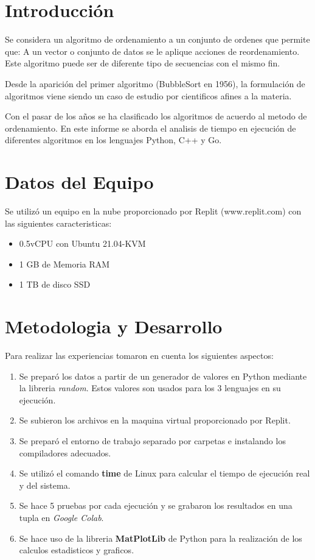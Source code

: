 \documentclass{article}
\begin{document}
	
		

    \section{Introducción}
    Se considera un algoritmo de ordenamiento a un conjunto de ordenes que permite que: A un vector o conjunto de datos se le aplique acciones de reordenamiento. Este algoritmo puede ser de diferente tipo de secuencias con el mismo fin. 

    Desde la aparición del primer algoritmo (BubbleSort en 1956), la formulación de algoritmos viene siendo un caso de estudio por cientificos afines a la materia.

    Con el pasar de los años se ha clasificado los algoritmos de acuerdo al metodo de ordenamiento.
    En este informe se aborda el analisis de tiempo en ejecución de diferentes algoritmos en los lenguajes Python, C++ y Go.
    
    \section{Datos del Equipo}
    Se utilizó un equipo en la nube proporcionado por Replit (www.replit.com) con las siguientes caracteristicas:

    \begin{itemize}
        \item 0.5vCPU con Ubuntu 21.04-KVM
        \item 1 GB de Memoria RAM
        \item 1 TB de disco SSD
    \end{itemize}

    \section{Metodologia y Desarrollo}
    Para realizar las experiencias tomaron en cuenta los siguientes aspectos:
    
    \begin{enumerate}
        \item Se preparó los datos a partir de un generador de valores en Python mediante la libreria \textit{random}. Estos valores son usados para los 3 lenguajes en su ejecución.
        \item Se subieron los archivos en la maquina virtual proporcionado por Replit.
        \item Se preparó el entorno de trabajo separado por carpetas e instalando los compiladores adecuados.
        \item Se utilizó el comando \textbf{time} de Linux para calcular el tiempo de ejecución real y del sistema.
        \item Se hace 5 pruebas por cada ejecución y se grabaron los resultados en una tupla en \textit{Google Colab}.
        \item Se hace uso de la libreria \textbf{MatPlotLib} de Python para la realización de los calculos estadisticos y graficos.
    \end{enumerate}
\end{document}
